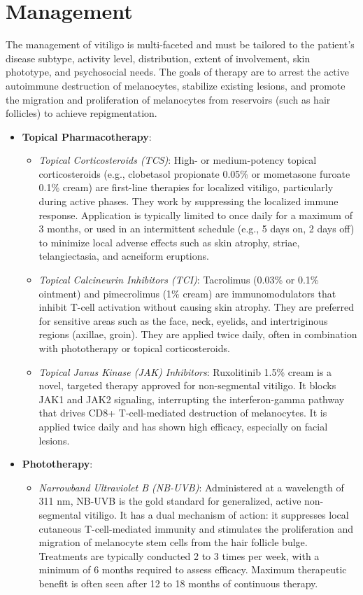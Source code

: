 \section*{Management}
The management of vitiligo is multi-faceted and must be tailored to the patient's disease subtype, activity level, distribution, extent of involvement, skin phototype, and psychosocial needs. The goals of therapy are to arrest the active autoimmune destruction of melanocytes, stabilize existing lesions, and promote the migration and proliferation of melanocytes from reservoirs (such as hair follicles) to achieve repigmentation.

\begin{itemize}
    \item \textbf{Topical Pharmacotherapy}:
    \begin{itemize}
        \item \textit{Topical Corticosteroids (TCS)}: High- or medium-potency topical corticosteroids (e.g., clobetasol propionate 0.05\% or mometasone furoate 0.1\% cream) are first-line therapies for localized vitiligo, particularly during active phases. They work by suppressing the localized immune response. Application is typically limited to once daily for a maximum of 3 months, or used in an intermittent schedule (e.g., 5 days on, 2 days off) to minimize local adverse effects such as skin atrophy, striae, telangiectasia, and acneiform eruptions.
        \item \textit{Topical Calcineurin Inhibitors (TCI)}: Tacrolimus (0.03\% or 0.1\% ointment) and pimecrolimus (1\% cream) are immunomodulators that inhibit T-cell activation without causing skin atrophy. They are preferred for sensitive areas such as the face, neck, eyelids, and intertriginous regions (axillae, groin). They are applied twice daily, often in combination with phototherapy or topical corticosteroids.
        \item \textit{Topical Janus Kinase (JAK) Inhibitors}: Ruxolitinib 1.5\% cream is a novel, targeted therapy approved for non-segmental vitiligo. It blocks JAK1 and JAK2 signaling, interrupting the interferon-gamma pathway that drives CD8+ T-cell-mediated destruction of melanocytes. It is applied twice daily and has shown high efficacy, especially on facial lesions.
    \end{itemize}
    \item \textbf{Phototherapy}:
    \begin{itemize}
        \item \textit{Narrowband Ultraviolet B (NB-UVB)}: Administered at a wavelength of 311 nm, NB-UVB is the gold standard for generalized, active non-segmental vitiligo. It has a dual mechanism of action: it suppresses local cutaneous T-cell-mediated immunity and stimulates the proliferation and migration of melanocyte stem cells from the hair follicle bulge. Treatments are typically conducted 2 to 3 times per week, with a minimum of 6 months required to assess efficacy. Maximum therapeutic benefit is often seen after 12 to 18 months of continuous therapy.

\end{itemize}
\end{itemize}
